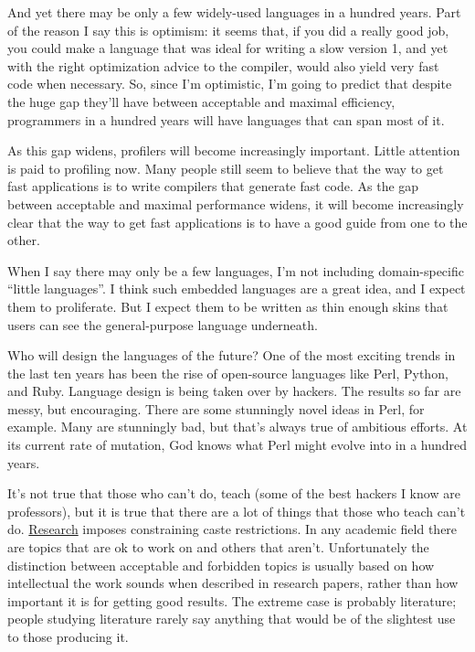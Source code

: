 And yet there may be only a few widely-used languages in a hundred
years. Part of the reason I say this is optimism: it seems that, if you
did a really good job, you could make a language that was ideal for
writing a slow version 1, and yet with the right optimization advice to
the compiler, would also yield very fast code when necessary. So, since
I'm optimistic, I'm going to predict that despite the huge gap they'll
have between acceptable and maximal efficiency, programmers in a hundred
years will have languages that can span most of it.

As this gap widens, profilers will become increasingly important. Little
attention is paid to profiling now. Many people still seem to believe
that the way to get fast applications is to write compilers that
generate fast code. As the gap between acceptable and maximal
performance widens, it will become increasingly clear that the way to
get fast applications is to have a good guide from one to the other.

When I say there may only be a few languages, I'm not including
domain-specific ``little languages''. I think such embedded languages
are a great idea, and I expect them to proliferate. But I expect them to
be written as thin enough skins that users can see the general-purpose
language underneath.

Who will design the languages of the future? One of the most exciting
trends in the last ten years has been the rise of open-source languages
like Perl, Python, and Ruby. Language design is being taken over by
hackers. The results so far are messy, but encouraging. There are some
stunningly novel ideas in Perl, for example. Many are stunningly bad,
but that's always true of ambitious efforts. At its current rate of
mutation, God knows what Perl might evolve into in a hundred years.

It's not true that those who can't do, teach (some of the best hackers I
know are professors), but it is true that there are a lot of things that
those who teach can't do. \href{desres.html}{Research} imposes
constraining caste restrictions. In any academic field there are topics
that are ok to work on and others that aren't. Unfortunately the
distinction between acceptable and forbidden topics is usually based on
how intellectual the work sounds when described in research papers,
rather than how important it is for getting good results. The extreme
case is probably literature; people studying literature rarely say
anything that would be of the slightest use to those producing it.

